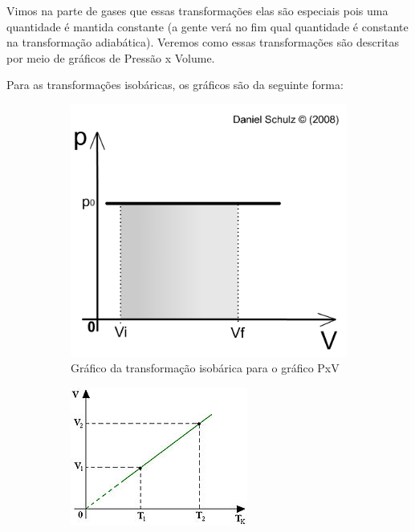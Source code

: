 \documentclass[12pt]{extarticle}
\newcommand{\<}{\langle}
\renewcommand{\>}{\rangle}
\theoremstyle{definition}
\begin{document}
Vimos na parte de gases que essas transformações elas são especiais pois uma quantidade é mantida constante (a gente verá no fim qual quantidade é constante na transformação adiabática). Veremos como essas transformações são descritas por meio de gráficos de Pressão x Volume.

Para as transformações isobáricas, os gráficos são da seguinte forma:
\begin{figure}[h]
     \centering
     \begin{subfigure}[b]{0.45\textwidth}
         \centering
         \includegraphics[width=\textwidth]{isobarica_area.jpg}
         \caption{Gráfico da transformação isobárica para o gráfico PxV}
         \label{fig:isobarica_pv}
     \end{subfigure}
     \hfill
     \begin{subfigure}[b]{0.45\textwidth}
         \centering
         \includegraphics[width=\textwidth]{220px-Diagrama_V_x_T_Transformação_Isobárica.jpg}

\end{subfigure}
\end{figure}
\end{document}

